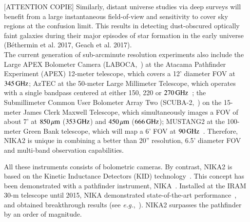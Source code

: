 [ATTENTION COPIE]
Similarly, distant universe studies via deep surveys will
benefit from a large instantaneous field-of-view and sensitivity
to cover sky regions at the confusion limit. This results
in detecting dust-obscured optically faint galaxies during
their major episodes of star formation in the early universe
(B\'ethermin et al. 2017, Geach et al. 2017).\\

The current generation of sub-arcminute resolution experiments also
include the Large APEX Bolometer Camera
(LABOCA,~\citet{Siringo2009_LABOCA}) at the Atacama
Pathfinder Experiment (APEX) 12-meter telescope, which covers a
12' diameter FOV at $345\, \rm{GHz}$; AzTEC at the
50-meter Large Millimeter Telescope, which operates with a
single bandpass centered at either 150, 220 or
$270\,\rm{GHz}$~\citep{Wilson2008_AZTEC}; the Submillimeter Common User Bolometer
Array Two (SCUBA-2,~\citet{Holland2013_SCUBA2,Dempsey2013_SCUBA2}) on the
15-meter James Clerk Maxwell Telescope, which simultaneously
images a FOV of about 7' at $850\, \mu\rm{m}$ ($353\,
\rm{GHz}$) and $450\, \mu\rm{m}$
($666\,\rm{GHz}$); MUSTANG2 at the 100-meter Green Bank telescope,
which will map a 6' FOV at
$90\,\rm{GHz}$~\citep{Dicker2014_MUSTANG2}. Therefore, NIKA2 is unique
in combining a better than 20'' resolution, 6.5' diameter FOV
and multi-band observation capabilities. 

All these instruments consists of bolometric cameras. By contrast,
NIKA2 is based on the Kinetic Inductance Detectors (KID)
technology~\citep{Day2003, Doyle2008_LEKID}. This concept has been
demonstrated with a pathfinder instrument,
NIKA~\citep{Monfardini2011_NIKA}.
Installed at the IRAM 30-m telescope until 2015, NIKA demonstrated
state-of-the-art performance~\citep{Catalano2014}, and obtained
breakthrough results
(see \emph{e.g.},~\citet{Adam2017_kSZ}). NIKA2 surpasses the
pathfinder by an order of magnitude. 


%

